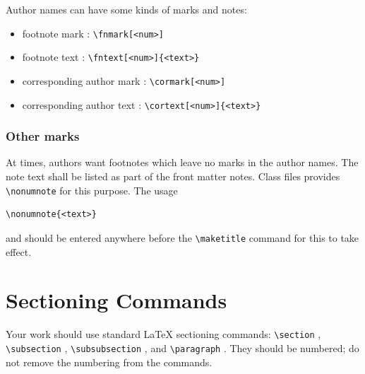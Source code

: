 \documentclass[%
]{ceurart}
\begin{document}
Author names can have some kinds of marks and notes:
\begin{itemize}
\item footnote mark :
\verb|\fnmark[<num>]|

\item footnote text :
\verb|\fntext[<num>]{<text>}|

\item corresponding author mark :
\verb|\cormark[<num>]|

\item corresponding author text :
\verb|\cortext[<num>]{<text>}|

\end{itemize}

\subsubsection{Other marks}

At times, authors want footnotes which leave no marks in the author names. The note text shall be listed as part of the front matter notes. Class files provides
\verb|\nonumnote|
 for this purpose. The usage
\begin{lstlisting}[language={[latex]TeX}]
\nonumnote{<text>}
\end{lstlisting}
and should be entered anywhere before the
\verb|\maketitle|
 command for this to take effect.

\section{Sectioning Commands}

Your work should use standard \LaTeX{} sectioning commands:
\verb|\section|%
,
\verb|\subsection|%
,
\verb|\subsubsection|%
, and
\verb|\paragraph|%
.
They should be numbered; do not remove the numbering from the commands.
\end{document}
